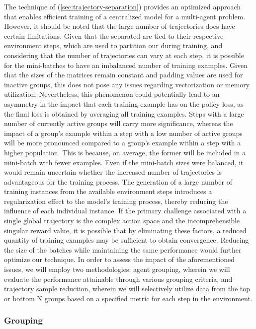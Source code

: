 \noindent The technique of  (\autoref{sec:trajectory-separation}) provides an optimized approach that enables efficient training of a centralized model for a multi-agent problem. However, it should be noted that the large number of trajectories does have certain limitations. Given that the separated  are tied to their respective environment steps, which are used to partition our  during training, and considering that the number of trajectories can vary at each step, it is possible for the mini-batches to have an imbalanced number of training examples. Given that the sizes of the matrices remain constant and padding values are used for inactive groups, this does not pose any issues regarding vectorization or memory utilization. Nevertheless, this phenomenon could potentially lead to an asymmetry in the impact that each training example has on the policy loss, as the final loss is obtained by averaging all training examples. Steps with a large number of currently active groups will carry more significance, whereas the impact of a group's example within a step with a low number of active groups will be more pronounced compared to a group's example within a step with a higher population. This is because, on average, the former will be included in a mini-batch with fewer examples. Even if the mini-batch sizes were balanced, it would remain uncertain whether the increased number of trajectories is advantageous for the training process. The generation of a large number of training instances from the available environment steps introduces a regularization effect to the model's training process, thereby reducing the influence of each individual instance. If the primary challenge associated with a single global trajectory is the complex action space and the incomprehensible singular reward value, it is possible that by eliminating these factors, a reduced quantity of training examples may be sufficient to obtain convergence. Reducing the size of the batches while maintaining the same performance would further optimize our technique. In order to assess the impact of the aforementioned issues, we will employ two methodologies: agent grouping, wherein we will evaluate the performance attainable through various grouping criteria, and trajectory sample reduction, wherein we will selectively utilize data from the top or bottom N groups based on a specified metric for each step in the environment.

\subsubsection{Grouping}

